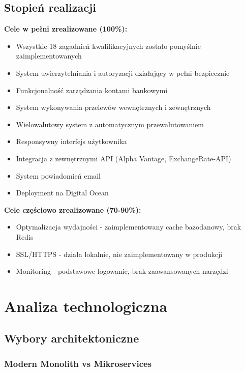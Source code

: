 \documentclass[12pt,a4paper]{article}
\begin{document}
    \subsection{Stopień realizacji}

    \textbf{Cele w pełni zrealizowane (100\%):}
    \begin{itemize}
        \item Wszystkie 18 zagadnień kwalifikacyjnych zostało pomyślnie zaimplementowanych
        \item System uwierzytelniania i autoryzacji działający w pełni bezpiecznie
        \item Funkcjonalność zarządzania kontami bankowymi
        \item System wykonywania przelewów wewnętrznych i zewnętrznych
        \item Wielowalutowy system z automatycznym przewalutowaniem
        \item Responsywny interfejs użytkownika
        \item Integracja z zewnętrznymi API (Alpha Vantage, ExchangeRate-API)
        \item System powiadomień email
        \item Deployment na Digital Ocean
    \end{itemize}

    \textbf{Cele częściowo zrealizowane (70-90\%):}
    \begin{itemize}
        \item Optymalizacja wydajności - zaimplementowany cache bazodanowy, brak Redis
        \item SSL/HTTPS - działa lokalnie, nie zaimplementowany w produkcji
        \item Monitoring - podstawowe logowanie, brak zaawansowanych narzędzi
    \end{itemize}

    \section{Analiza technologiczna}

    \subsection{Wybory architektoniczne}

    \subsubsection{Modern Monolith vs Mikroservices}
\end{document}
